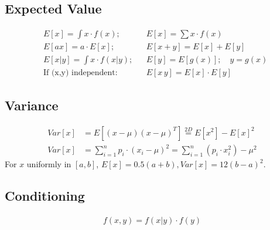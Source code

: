 \documentclass[landscape,a4paper,8pt]{scrartcl}
\begin{document}
\begin{multicols*}{3}
\subsection{Expected Value}
\vspace{-10pt}
\begin{align*}
&E[x] = \int x \cdot f(x); & &E[x] = \sum x \cdot f(x) \\
&E[a x] = a \cdot E[x]; & &E[x+y] = E[x] + E[y]  \\
&E[x|y] = \int x \cdot f(x|y); & &E[y] = E[g(x)]; \quad y=g(x) \\
&\text{If (x,y) independent:} & &E[x\, y] = E[x] \cdot E[y] 
\end{align*}



\subsection{Variance}
\vspace{-10pt}
\begin{align*}
Var[x] &= E[(x-\mu) ( x - \mu)^T] \overset{2D}{=} E[x^2] - E[x]^2 \tag{cont.} \\
Var[x] &= \sum_{i=1}^{n} p_i \cdot (x_i-\mu)^2 = \sum_{i=1}^{n} (p_i \cdot x_i^2) - \mu^2 \tag{discrete}
\end{align*}
For $x$ uniformly in $[a, b]$, $E [x] = 0.5 (a + b), Var[x] = 12 (b - a)^2$.



\subsection{Conditioning}
\vspace{-5pt}
\begin{align*}
f(x,y) = f(x|y) \cdot f(y)
\end{align*}


\end{multicols*}
\end{document}
